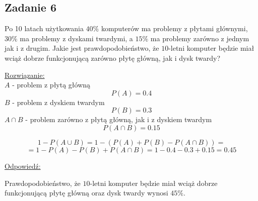 \subsection{Zadanie 6}

Po 10 latach użytkowania $40\%$ komputerów ma problemy z płytami głównymi,
$30\%$ ma problemy z dyskami twardymi, a $15\%$ ma problemy zarówno z jednym
jak i z drugim. Jakie jest prawdopodobieństwo, że $10$-letni komputer będzie
miał wciąż dobrze funkcjonującą zarówno płytę główną, jak i dysk twardy?

\underline{Rozwiązanie:}
$$
$$
$A$ - problem z płytą główną
$$
P(A)=0.4
$$
$B$ - problem z dyskiem twardym
$$
P(B)=0.3
$$
$A \cap B$ - problem zarówno z płytą główną, jak i z dyskiem twardym
$$
P( A \cap B ) = 0.15
$$

$$
1 - P( A \cup B ) = 1 - ( P(A) + P(B) - P( A \cap B ) ) = 
$$
$$
= 1 - P(A) - P(B) + P( A \cap B ) = 1 - 0.4 - 0.3 + 0.15 = 0.45
$$

\underline{Odpowiedź:}

Prawdopodobieństwo, że $10$-letni komputer będzie miał wciąż dobrze funkcjonującą
płytę główną oraz dysk twardy wynosi $45\%$.

